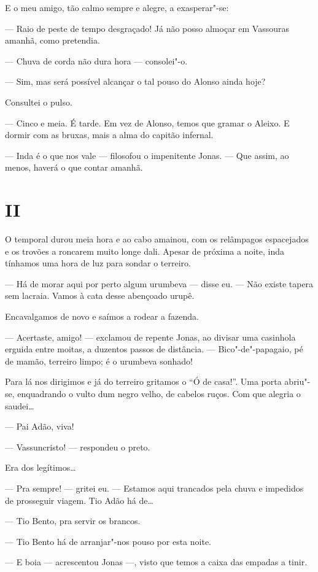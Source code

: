 E o meu amigo, tão calmo sempre e alegre, a exasperar"-se:

--- Raio de peste de tempo desgraçado! Já não posso almoçar em Vassouras
amanhã, como pretendia.

--- Chuva de corda não dura hora --- consolei"-o.

--- Sim, mas será possível alcançar o tal pouso do Alonso ainda hoje?

Consultei o pulso.

--- Cinco e meia. É tarde. Em vez de Alonso, temos que gramar o Aleixo.
E dormir com as bruxas, mais a alma do capitão infernal.

--- Inda é o que nos vale --- filosofou o impenitente Jonas. --- Que
assim, ao menos, haverá o que contar amanhã.

\section*{II}

O temporal durou meia hora e ao cabo amainou, com os relâmpagos
espacejados e os trovões a roncarem muito longe dali. Apesar de próxima
a noite, inda tínhamos uma hora de luz para sondar o terreiro.

--- Há de morar aqui por perto algum urumbeva --- disse eu. --- Não
existe tapera sem lacraia. Vamos à cata desse abençoado urupê.

Encavalgamos de novo e saímos a rodear a fazenda.

--- Acertaste, amigo! --- exclamou de repente Jonas, ao divisar uma
casinhola erguida entre moitas, a duzentos passos de distância. ---
Bico"-de"-papagaio, pé de mamão, terreiro limpo; é o urumbeva sonhado!

Para lá nos dirigimos e já do terreiro gritamos o ``Ó de casa!''. Uma
porta abriu"-se, enquadrando o vulto dum negro velho, de cabelos ruços.
Com que alegria o saudei\ldots{}

--- Pai Adão, viva!

--- Vassuncristo! --- respondeu o preto.

Era dos legítimos\ldots{}

--- Pra sempre! --- gritei eu. --- Estamos aqui trancados pela chuva e
impedidos de prosseguir viagem. Tio Adão há de\ldots{}

--- Tio Bento, pra servir os brancos.

--- Tio Bento há de arranjar"-nos pouso por esta noite.

--- E boia --- acrescentou Jonas ---, visto que temos a caixa das
empadas a tinir.

